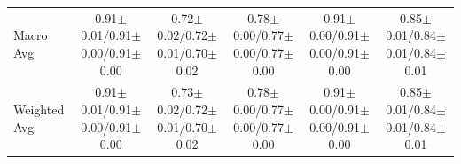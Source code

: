 \begin{table}[!t]
{\begin{tabular}{l|cccc|cccc|cccc|cccc|cccc}
Macro Avg & \multicolumn{4}{c|}{0.91$\pm$0.01/0.91$\pm$0.00/0.91$\pm$0.00} & \multicolumn{4}{c|}{0.72$\pm$0.02/0.72$\pm$0.01/0.70$\pm$0.02} & \multicolumn{4}{c|}{0.78$\pm$0.00/0.77$\pm$0.00/0.77$\pm$0.00} & \multicolumn{4}{c|}{0.91$\pm$0.00/0.91$\pm$0.00/0.91$\pm$0.00} & \multicolumn{4}{c}{0.85$\pm$0.01/0.84$\pm$0.01/0.84$\pm$0.01} \\
Weighted Avg & \multicolumn{4}{c|}{0.91$\pm$0.01/0.91$\pm$0.00/0.91$\pm$0.00} & \multicolumn{4}{c|}{0.73$\pm$0.02/0.72$\pm$0.01/0.70$\pm$0.02} & \multicolumn{4}{c|}{0.78$\pm$0.00/0.77$\pm$0.00/0.77$\pm$0.00} & \multicolumn{4}{c|}{0.91$\pm$0.00/0.91$\pm$0.00/0.91$\pm$0.00} & \multicolumn{4}{c}{0.85$\pm$0.01/0.84$\pm$0.01/0.84$\pm$0.01} \\
\bottomrule
\end{tabular}}
\end{table}


